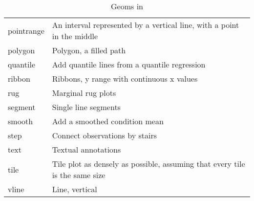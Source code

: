 \begin{table}
\begin{center}
\begin{tabular}{lp{3in}}
  pointrange   & An interval represented by a vertical line, with a point in the middle       \\
  polygon      & Polygon, a filled path                                                       \\
  quantile     & Add quantile lines from a quantile regression                                \\
  ribbon       & Ribbons, y range with continuous x values                                    \\
  rug          & Marginal rug plots                                                           \\
  segment      & Single line segments                                                         \\
  smooth       & Add a smoothed condition mean                                               \\
  step         & Connect observations by stairs                                               \\
  text         & Textual annotations                                                          \\
  tile         & Tile plot as densely as possible, assuming that every tile is the same size \\
  vline        & Line, vertical                                                               \\

  \bottomrule
  \end{tabular}
  \end{center}
  \caption{Geoms in \ggplot}
  \label{tbl:geoms}
\end{table}

